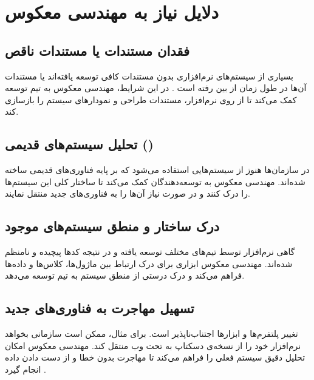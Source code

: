 \section{دلایل نیاز به مهندسی معکوس}

\subsection{فقدان مستندات یا مستندات ناقص}
بسیاری از سیستم‌های نرم‌افزاری بدون مستندات کافی توسعه یافته‌اند یا مستندات آن‌ها در طول زمان از بین رفته است \cite{pressman2020software}. در این شرایط، مهندسی معکوس به تیم توسعه کمک می‌کند تا از روی نرم‌افزار، مستندات طراحی و نمودارهای سیستم را بازسازی کند.

\subsection{تحلیل سیستم‌های قدیمی ()}
در سازمان‌ها هنوز از سیستم‌هایی استفاده می‌شود که بر پایه فناوری‌های قدیمی ساخته شده‌اند. مهندسی معکوس به توسعه‌دهندگان کمک می‌کند تا ساختار کلی این سیستم‌ها را درک کنند و در صورت نیاز آن‌ها را به فناوری‌های جدید منتقل نمایند.

\subsection{درک ساختار و منطق سیستم‌های موجود}
گاهی نرم‌افزار توسط تیم‌های مختلف توسعه یافته و در نتیجه کدها پیچیده و نامنظم شده‌اند. مهندسی معکوس ابزاری برای درک ارتباط بین ماژول‌ها، کلاس‌ها و داده‌ها فراهم می‌کند و درک درستی از منطق سیستم به تیم توسعه می‌دهد.

\subsection{تسهیل مهاجرت به فناوری‌های جدید}
تغییر پلتفرم‌ها و ابزارها اجتناب‌ناپذیر است. برای مثال، ممکن است سازمانی بخواهد نرم‌افزار خود را از نسخه‌ی دسکتاپ به تحت وب منتقل کند. مهندسی معکوس امکان تحلیل دقیق سیستم فعلی را فراهم می‌کند تا مهاجرت بدون خطا و از دست دادن داده انجام گیرد \cite{pressman2020software}.
